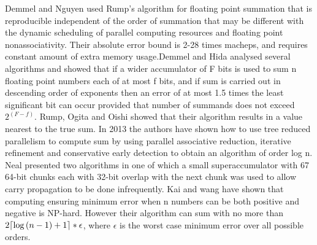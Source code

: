 \documentclass[11pt]{article}       %
\DeclarePairedDelimiter{\ceil}{\lceil}{\rceil}
\begin{document}
Demmel and Nguyen \cite{PRS} used Rump’s algorithm for floating point summation that is reproducible independent of the order of summation that may be different with the dynamic scheduling of parallel computing resources and floating point nonassociativity. Their absolute error bound is 2-28 times macheps, and requires constant amount of extra memory usage.Demmel and Hida \cite{AEFPS} analysed several algorithms and showed that if a wider accumulator of F bits is used to sum n floating point numbers each of at most f bits, and if sum is carried out in descending order of exponents then an error of at most 1.5 times the least significant bit can occur provided that number of summands does not exceed $2^{(F-f)}$.
Rump, Ogita and Oishi \cite{AFPSPFR} showed that their algorithm results in a value nearest to the true sum. 
In 2013 the authors \cite{APFPA} have shown how to use tree reduced parallelism to compute sum by using parallel associative reduction, iterative refinement and conservative early detection to obtain an algorithm of order log n. 
Neal \cite{FESUSLS} presented two algorithms in one of which a small superaccumulator with 67 64-bit chunks each with 32-bit overlap with the next chunk was used to allow carry propagation to be done infrequently. Kai and wang \cite{LTALCNS} have shown that computing ensuring minimum error when n numbers can be both positive and negative is NP-hard. However their algorithm can sum with no more than $2\ceil*{\log {(n-1)}+1}*\epsilon$, where $\epsilon$ is the worst case minimum error over all possible orders.





\end{document}
